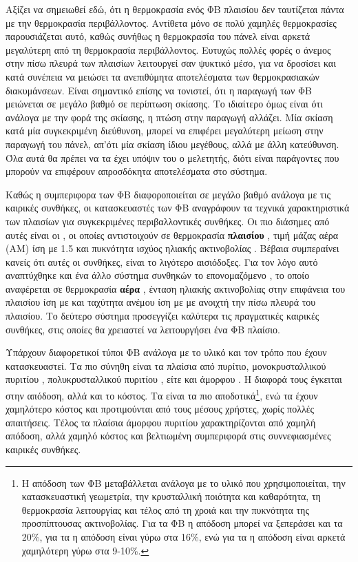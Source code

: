 \documentclass[12pt]{report}
\begin{document}
Αξίζει να σημειωθεί εδώ, ότι η θερμοκρασία ενός ΦΒ πλαισίου δεν ταυτίζεται πάντα με την θερμοκρασία περιβάλλοντος. Αντίθετα μόνο σε πολύ χαμηλές θερμοκρασίες παρουσιάζεται αυτό, καθώς συνήθως η θερμοκρασία του πάνελ είναι αρκετά 
μεγαλύτερη από τη θερμοκρασία περιβάλλοντος. Ευτυχώς πολλές φορές ο άνεμος στην πίσω πλευρά των πλαισίων λειτουργεί σαν ψυκτικό μέσο, για να δροσίσει και κατά συνέπεια να μειώσει τα ανεπιθύμητα αποτελέσματα των θερμοκρασιακών 
διακυμάνσεων. Είναι σημαντικό επίσης να τονιστεί, ότι η παραγωγή των ΦΒ μειώνεται σε μεγάλο βαθμό σε περίπτωση σκίασης. Το ιδιαίτερο όμως είναι ότι ανάλογα με την φορά της σκίασης, η πτώση στην παραγωγή αλλάζει. Μία σκίαση κατά μία 
συγκεκριμένη διεύθυνση, μπορεί να επιφέρει μεγαλύτερη μείωση στην παραγωγή του πάνελ, απ'ότι μία σκίαση ίδιου μεγέθους, αλλά με άλλη κατεύθυνση. Όλα αυτά θα πρέπει να τα έχει υπόψιν του ο μελετητής, διότι είναι παράγοντες που μπορούν
να επιφέρουν απροσδόκητα αποτελέσματα στο σύστημα. 

Καθώς η συμπεριφορα των ΦΒ διαφοροποιείται σε μεγάλο βαθμό ανάλογα με τις καιρικές συνθήκες, οι κατασκευαστές των ΦΒ αναγράφουν τα τεχνικά χαρακτηριστικά των πλαισίων για συγκεκριμένες περιβαλλοντικές συνθήκες. Οι πιο διάσημες
από αυτές είναι οι {}, οι οποίες αντιστοιχούν σε θερμοκρασία \textbf{πλαισίου} {}, τιμή μάζας αέρα (ΑΜ) ίση με 1.5 και πυκνότητα ισχύος ηλιακής ακτινοβολίας 
{}. Βέβαια συμπεραίνει κανείς ότι αυτές οι συνθήκες, είναι το λιγότερο αισιόδοξες. Για τον λόγο αυτό αναπτύχθηκε και ένα άλλο σύστημα συνθηκών το επονομαζόμενο 
{}, το οποίο αναφέρεται σε θερμοκρασία \textbf{αέρα} {}, ένταση ηλιακής ακτινοβολίας στην επιφάνεια του πλαισίου ίση με {} 
και ταχύτητα ανέμου ίση με {} με ανοιχτή την πίσω πλευρά του πλαισίου. Το δεύτερο σύστημα προσεγγίζει καλύτερα τις πραγματικές καιρικές συνθήκες, στις οποίες θα χρειαστεί να λειτουργήσει ένα ΦΒ πλαίσιο. 

Υπάρχουν διαφορετικοί τύποι ΦΒ ανάλογα με το υλικό και τον τρόπο που έχουν κατασκευαστεί. Τα πιο σύνηθη είναι τα πλαίσια από πυρίτιο, μονοκρυσταλλικού πυριτίου {}, πολυκρυσταλλικού πυριτίου 
{}, είτε και άμορφου {}. Η διαφορά τους έγκειται στην απόδοση, αλλά και το κόστος. Τα {} είναι τα πιο αποδοτικά\footnote{Η απόδοση των ΦΒ μεταβάλλεται ανάλογα με το 
υλικό που χρησιμοποιείται, την κατασκευαστική γεωμετρία, την κρυσταλλική ποιότητα και καθαρότητα, τη θερμοκρασία λειτουργίας και τέλος από τη χροιά και την πυκνότητα της προσπίπτουσας ακτινοβολίας. Για τα {}
ΦΒ η απόδοση μπορεί να ξεπεράσει και τα 20\%, για τα {} η απόδοση είναι γύρω στα 16\%, ενώ για τα {} η απόδοση είναι αρκετά χαμηλότερη γύρω στα 9-10\%.}, 
ενώ τα {} έχουν χαμηλότερο κόστος και προτιμούνται από τους μέσους χρήστες, χωρίς πολλές απαιτήσεις. Τέλος τα πλαίσια άμορφου πυριτίου χαρακτηρίζονται από χαμηλή απόδοση, αλλά χαμηλό κόστος και βελτιωμένη 
συμπεριφορά στις συννεφιασμένες καιρικές συνθήκες.
\end{document}

